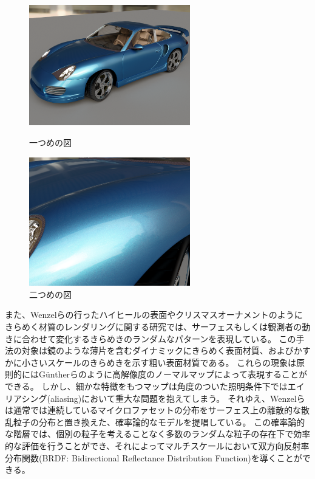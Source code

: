 \begin{figure}[htbp]
 \begin{minipage}{0.4\hsize}
  \begin{center}
   \includegraphics[width=70mm]{./img/porsche01.png}
  \end{center}
  \caption{一つめの図}
  \label{fig:one}
 \end{minipage}
 \begin{minipage}{0.75\hsize}
  \begin{center}
    \includegraphics[width=70mm]{./img/porsche03.png}
  \end{center}
  \caption{二つめの図}
  \label{fig:two}
 \end{minipage}
\end{figure}

\noindent
また、Wenzelら\cite{}の行ったハイヒールの表面やクリスマスオーナメントのようにきらめく材質のレンダリングに関する研究では、サーフェスもしくは観測者の動きに合わせて変化するきらめきのランダムなパターンを表現している。
この手法の対象は鏡のような薄片を含むダイナミックにきらめく表面材質、およびかすかに小さいスケールのきらめきを示す粗い表面材質である。
これらの現象は原則的にはG\"{u}ntherらのように高解像度のノーマルマップによって表現することができる。
しかし、細かな特徴をもつマップは角度のついた照明条件下ではエイリアシング(aliasing)において重大な問題を抱えてしまう。
それゆえ、Wenzelらは通常では連続しているマイクロファセットの分布をサーフェス上の離散的な散乱粒子の分布と置き換えた、確率論的なモデルを提唱している。
この確率論的な階層では、個別の粒子を考えることなく多数のランダムな粒子の存在下で効率的な評価を行うことができ、それによってマルチスケールにおいて双方向反射率分布関数(BRDF: Bidirectional Reflectance Distribution Function)を導くことができる。

